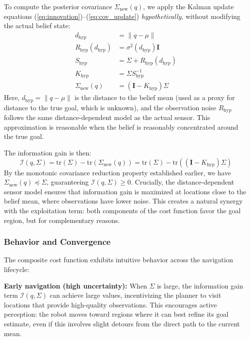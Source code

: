 To compute the posterior covariance $\Sigma_{\text{new}}(q)$, we apply the Kalman update equations (\ref{eq:innovation})--(\ref{eq:cov_update}) \emph{hypothetically}, without modifying the actual belief state:
\begin{align}
    d_{\text{hyp}} &= \|q - \mu\| \label{eq:hyp_distance} \\
    R_{\text{hyp}}(d_{\text{hyp}}) &= \sigma^2(d_{\text{hyp}}) \mathbf{I} \label{eq:hyp_obs_cov} \\
    S_{\text{hyp}} &= \Sigma + R_{\text{hyp}}(d_{\text{hyp}}) \label{eq:hyp_innovation_cov} \\
    K_{\text{hyp}} &= \Sigma S_{\text{hyp}}^{-1} \label{eq:hyp_kalman_gain} \\
    \Sigma_{\text{new}}(q) &= (\mathbf{I} - K_{\text{hyp}}) \Sigma \label{eq:hyp_cov_update}
\end{align}
Here, $d_{\text{hyp}} = \|q - \mu\|$ is the distance to the belief mean (used as a proxy for distance to the true goal, which is unknown), and the observation noise $R_{\text{hyp}}$ follows the same distance-dependent model as the actual sensor. This approximation is reasonable when the belief is reasonably concentrated around the true goal.

The information gain is then:
\begin{equation}
    \mathcal{I}(q, \Sigma) = \text{tr}(\Sigma) - \text{tr}(\Sigma_{\text{new}}(q)) = \text{tr}(\Sigma) - \text{tr}((\mathbf{I} - K_{\text{hyp}}) \Sigma)
\end{equation}
By the monotonic covariance reduction property established earlier, we have $\Sigma_{\text{new}}(q) \preceq \Sigma$, guaranteeing $\mathcal{I}(q, \Sigma) \geq 0$. Crucially, the distance-dependent sensor model ensures that information gain is maximized at locations close to the belief mean, where observations have lower noise. This creates a natural synergy with the exploitation term: both components of the cost function favor the goal region, but for complementary reasons.

\subsubsection{Behavior and Convergence}

The composite cost function exhibits intuitive behavior across the navigation lifecycle:

\textbf{Early navigation (high uncertainty):} When $\Sigma$ is large, the information gain term $\mathcal{I}(q, \Sigma)$ can achieve large values, incentivizing the planner to visit locations that provide high-quality observations. This encourages active perception: the robot moves toward regions where it can best refine its goal estimate, even if this involves slight detours from the direct path to the current mean.

